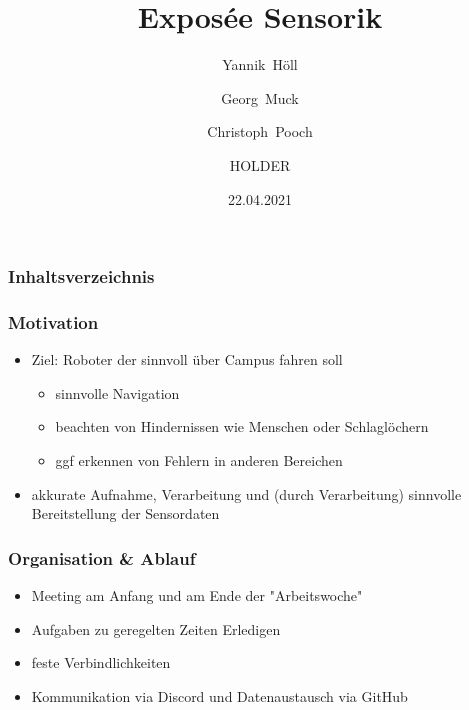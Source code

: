 \documentclass{beamer}
\title{Exposée Sensorik}
\author[Yannik, Georg, Christoph, Gwandil]
	{Yannik~Höll \and Georg~Muck \and Christoph~Pooch \and HOLDER}
\date{22.04.2021}
\begin{document}
	\frame{\titlepage}

\begin{frame}
	\frametitle{Inhaltsverzeichnis}
	\tableofcontents
\end{frame}


\begin{frame}
\frametitle{Motivation}
\begin{itemize}
\item<1-> Ziel: Roboter der sinnvoll über Campus fahren soll
\begin{itemize}
\item<2-4> sinnvolle Navigation
\item<3-4> beachten von Hindernissen wie Menschen oder Schlaglöchern
\item<4> ggf erkennen von Fehlern in anderen Bereichen
\end{itemize}

\item<5-> akkurate \alert<6->{Aufnahme}, \alert<7->{Verarbeitung} und (durch \alert<7->{Verarbeitung}) sinnvolle \alert<8->{Bereitstellung} der Sensordaten
\end{itemize}
\end{frame}

 \begin{frame}
\frametitle{ Organisation \& Ablauf}
\begin{itemize}
\item<1-> \alert{Meeting} am Anfang und am Ende der "Arbeitswoche"
\item<2-> Aufgaben zu geregelten Zeiten Erledigen
\item<3-> feste \alert{Verbindlichkeiten}
\item<4-> Kommunikation via \alert{Discord} und Datenaustausch via \alert{GitHub}
\end{itemize}
\end{frame}
\end{document}
